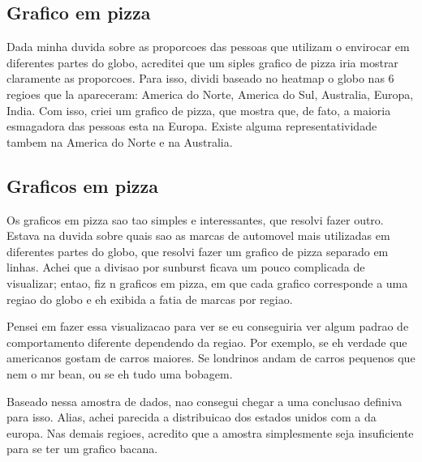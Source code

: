 \documentclass[10pt, conference]{IEEEtran}
\begin{document}


\subsection{Grafico em pizza}

Dada minha duvida sobre as proporcoes das pessoas que utilizam o envirocar em diferentes partes do globo,
acreditei que um siples grafico de pizza iria mostrar claramente as proporcoes. Para isso, dividi
baseado no heatmap o globo nas 6 regioes que la apareceram: America do Norte, America do Sul,
Australia, Europa, India. Com isso, criei um grafico de pizza, que mostra que, de fato, a maioria esmagadora
das pessoas esta na Europa. Existe alguma representatividade tambem na America do Norte e na Australia.




\subsection{Graficos em pizza}

Os graficos em pizza sao tao simples e interessantes, que resolvi fazer outro. Estava na duvida sobre quais
sao as marcas de automovel mais utilizadas em diferentes partes do globo, que resolvi fazer um grafico de 
pizza separado em linhas. Achei que a divisao por sunburst ficava um pouco complicada de visualizar; entao, fiz n graficos
em pizza, em que cada grafico corresponde a uma regiao do globo e eh exibida a fatia de marcas por regiao.

Pensei em fazer essa visualizacao para ver se eu conseguiria ver algum padrao de comportamento diferente
dependendo da regiao. Por exemplo, se eh verdade que americanos gostam de carros maiores. Se londrinos andam de
carros pequenos que nem o mr bean, ou se eh tudo uma bobagem.

Baseado nessa amostra de dados, nao consegui chegar a uma conclusao definiva para isso. Alias, achei 
parecida a distribuicao dos estados unidos com a da europa. Nas demais regioes, acredito que a amostra
simplesmente seja insuficiente para se ter um grafico bacana.
\end{document}
